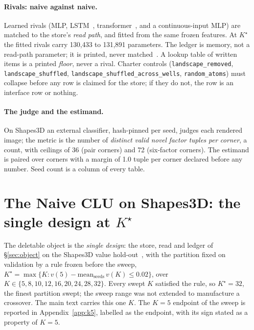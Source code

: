 \documentclass{article} %
\newcommand{\Kstar}{\ensuremath{K^{\star}}}
\begin{document}
\paragraph{Rivals: naive against naive.} Learned rivals (MLP, LSTM~\citep{hochreiter1997long}, transformer~\citep{vaswani2017attention}, and a
continuous-input MLP) are matched to the store's \emph{read path}, and fitted from the same
frozen features. At $\Kstar$ the fitted rivals carry 130,433 to 131,891 parameters.
The ledger is memory, not a read-path parameter; it is printed, never matched~\citep{borgeaud2021improving,khandelwal2020generalization,lample2019large,wu2022memorizing,berges2024memory}. A lookup table
of written items is a printed \emph{floor}, never a rival. Charter controls
(\texttt{landscape\_removed}, \texttt{landscape\_shuffled},
\texttt{landscape\_shuffled\_across\_wells}, \texttt{random\_atoms}) must collapse before any
row is claimed for the store; if they do not, the row is an interface row or nothing.

\paragraph{The judge and the estimand.} On Shapes3D an external classifier, hash-pinned per
seed, judges each rendered image; the metric is the number of \emph{distinct valid novel
factor tuples per corner}, a count, with ceilings of 36 (pair corners) and 72 (six-factor
corners). The estimand is paired over corners with a margin of 1.0 tuple per corner declared
before any number. %
Seed count is a column of every table.

\section{The Naive CLU on Shapes3D: the single design at $\Kstar$}
\label{sec:shapes}

The deletable object is the \emph{single design}: the store, read and ledger of
\S\ref{sec:object} on the Shapes3D value hold-out~\citep{montero2021role,schott2021visual}, with the partition fixed on validation
by a rule frozen before the sweep, $\Kstar=\max\{K : v(5)-\text{mean}_{\text{seeds}}\,v(K)\le
0.02\}$, over $K\in\{5,8,10,12,16,20,24,28,32\}$. Every swept $K$ satisfied the rule, so
$\Kstar=32$, the finest partition swept; the sweep range was not extended to manufacture a
crossover. %
The main text carries this one $K$. The $K=5$ endpoint of the sweep is reported in
Appendix~\ref{app:k5}, labelled as the endpoint, with its sign stated as a property of $K=5$.
\end{document}
